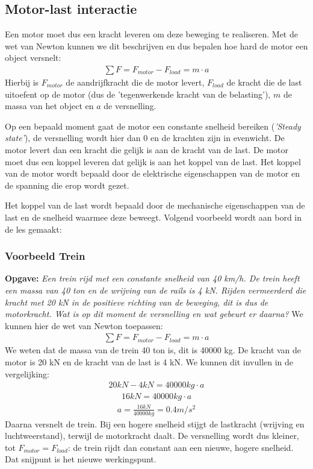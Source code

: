 \subsection{Motor-last interactie}
Een motor moet dus een kracht leveren om deze beweging te realiseren.
Met de wet van Newton kunnen we dit beschrijven en dus bepalen hoe hard de motor een
object versnelt:
\begin{align*}
    \sum F = F_{motor} - F_{load} = m \cdot a
\end{align*}
Hierbij is $F_{motor}$ de aandrijfkracht die de motor levert, $F_{load}$ de kracht die de
last uitoefent op de motor (dus de 'tegenwerkende kracht van de belasting'), $m$ de massa
van het object en $a$ de versnelling.

Op een bepaald moment gaat de motor een constante snelheid bereiken (\textit{'Steady
state'}), de versnelling wordt hier dan 0 en de krachten zijn in evenwicht.
De motor levert dan een kracht die gelijk is aan de kracht van de last.
De motor moet dus een koppel leveren dat gelijk is aan het koppel van de last.
Het koppel van de motor wordt bepaald door de elektrische eigenschappen van de motor en de
spanning die erop wordt gezet.

Het koppel van de last wordt bepaald door de mechanische eigenschappen van de last en de
snelheid waarmee deze beweegt.
Volgend voorbeeld wordt aan bord in de les gemaakt:

\subsubsection{Voorbeeld Trein}

\begin{oefenblok}
\textbf{Opgave:}
\newline
\textit{Een trein rijd met een constante snelheid van 40 km/h.
De trein heeft een massa van 40 ton en de wrijving van de rails is 4 kN.
Rijden vermeerderd die kracht met 20 kN in de positieve richting van de beweging, dit is
dus de motorkracht.
Wat is op dit moment de versnelling en wat gebeurt er daarna?}
\newline
We kunnen hier de wet van Newton toepassen:
\begin{align*}
    \sum F = F_{motor} - F_{load} = m \cdot a
\end{align*}
We weten dat de massa van de trein 40 ton is, dit is 40000 kg.
De kracht van de motor is 20 kN en de kracht van de last is 4 kN.
We kunnen dit invullen in de vergelijking:
\begin{align*}
    20 kN - 4 kN = 40000 kg \cdot a
\end{align*}
\begin{align*}
    16 kN = 40000 kg \cdot a
\end{align*}
\begin{align*}
    a = \frac{16 kN}{40000 kg} = 0.4 m/s^2
\end{align*}
Daarna versnelt de trein.
Bij een hogere snelheid stijgt de lastkracht (wrijving en luchtweerstand), terwijl de
motorkracht daalt.
De versnelling wordt dus kleiner, tot $F_{motor} = F_{load}$: de trein rijdt dan
constant aan een nieuwe, hogere snelheid.
Dat snijpunt is het nieuwe werkingspunt.
\end{oefenblok}

